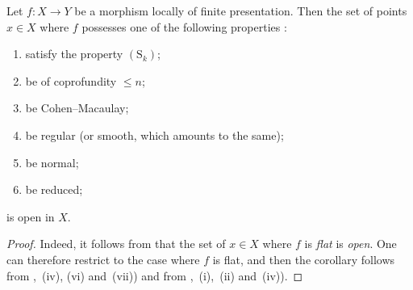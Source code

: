 \begin{corollary}[12.1.7]
\label{IV.12.1.7}
Let $f:X\to Y$ be a morphism locally of finite presentation.
Then the set of points $x\in X$ where $f$ possesses one of the following properties :
\begin{enumerate}[label=(\roman*)]
  \item satisfy the property $(\mathrm{S}_k)$;
  \item be of coprofundity $\leqslant n$;
  \item be Cohen--Macaulay;
  \item be regular (or smooth, which amounts to the same);
  \item be normal;
  \item be reduced;
\end{enumerate}
is open in $X$.
\end{corollary}

\begin{proof}
Indeed, it follows from  that the set of $x\in X$ where $f$ is \emph{flat} is \emph{open}.
One can therefore restrict to the case where $f$ is flat, and then the corollary follows from ,~(iv), (vi) and~(vii)) and from ,~(i),~(ii) and~(iv)).
\end{proof}


